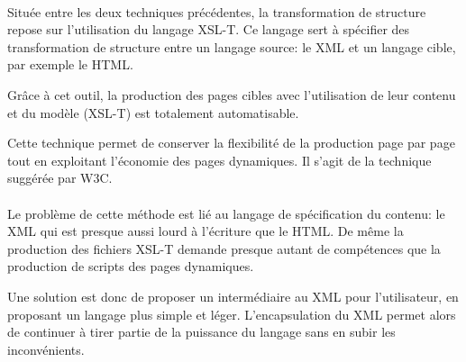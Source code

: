 \paragraph{}Située entre les deux techniques précédentes, la transformation de structure repose sur l'utilisation du langage XSL-T. Ce langage sert à spécifier des transformation de structure entre un langage source: le XML et un langage cible, par exemple le HTML. 

Grâce à cet outil, la production des pages cibles avec l'utilisation de leur contenu et du modèle (XSL-T) est totalement automatisable.

Cette technique permet de conserver la flexibilité de la production page par page tout en exploitant l'économie des pages dynamiques. Il s'agit de la technique suggérée par W3C.

\paragraph{}Le problème de cette méthode est lié au langage de spécification du contenu: le XML qui est presque aussi lourd à l'écriture que le HTML. De même la production des fichiers XSL-T demande presque autant de compétences que la production de scripts des pages dynamiques.

Une solution est donc de proposer un intermédiaire au XML pour l'utilisateur, en proposant un langage plus simple et léger. L'encapsulation du XML permet alors de continuer à tirer partie de la puissance du langage sans en subir les inconvénients. 
